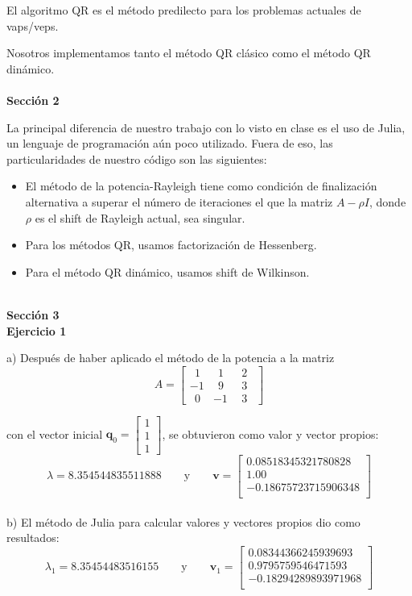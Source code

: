 \documentclass[11pt]{article}
\begin{document}
El algoritmo QR es el método predilecto para los problemas actuales de vaps/veps.

Nosotros implementamos tanto el método QR clásico como el método QR dinámico.
\\
\\
\noindent
\textbf{\LARGE{Sección 2}}

\noindent
La principal diferencia de nuestro trabajo con lo visto en clase es el uso de
Julia, un lenguaje de programación aún poco utilizado. Fuera de eso, las
particularidades de nuestro código son las siguientes:

\begin{itemize}
	\item El método de la potencia-Rayleigh tiene como condición de finalización
		alternativa a superar el número de iteraciones el que la matriz $A-\rho I$,
		donde $\rho$ es el shift de Rayleigh actual, sea singular.
	\item Para los métodos QR, usamos factorización de Hessenberg.
	\item Para el método QR dinámico, usamos shift de Wilkinson.
\end{itemize}

\\
\noindent
\textbf{\LARGE{Sección 3}}
\\
\noindent
\textbf{Ejercicio 1}

a) Después de haber aplicado el método de la potencia a la matriz
$$
A =
\begin{bmatrix}
\ \ 1 & \ \ 1 & \ \ 2 \ \ \\
-1 & \ \ 9 & \ \ 3 \ \ \\
\ \ 0 & -1 & \ \ 3 \ \
\end{bmatrix}
$$

con el vector inicial $\textbf{q}_0 =
\begin{bmatrix}
1 \\
1 \\
1
\end{bmatrix}$, se obtuvieron como valor y vector propios:
 \[
 \lambda = 8.354544835511888
 \qquad\text{y}\qquad
 \textbf{v} = \begin{bmatrix}
 0.08518345321780828 \\
 1.00     \\
 -0.18675723715906348 \\
\end{bmatrix}
 \]
 \\

b) El método de Julia para calcular valores y vectores propios dio como resultados:
\[
 \lambda_1 = 8.35454483516155
 \qquad\text{y}\qquad
 \textbf{v}_1 = \begin{bmatrix}
0.08344366245939693 \\
0.9795759546471593 \\
-0.18294289893971968 \\
\end{bmatrix}
 \]
 \\
\end{document}
